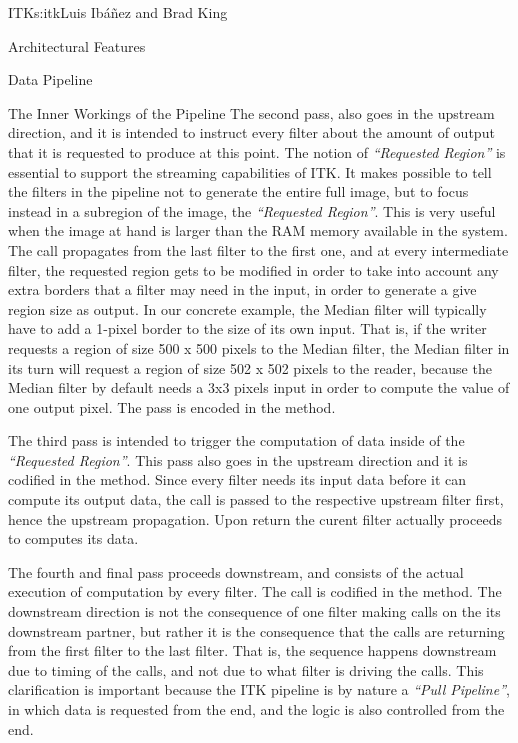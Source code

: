\begin{aosachapter}{ITK}{s:itk}{Luis Ib\'{a}\~{n}ez and Brad King}
\begin{aosasect1}{Architectural Features}
\begin{aosasect2}{Data Pipeline}
\begin{aosasect3}{The Inner Workings of the Pipeline}
The second pass, also goes in the upstream direction, and it is intended to
instruct every filter about the amount of output that it is requested to
produce at this point. The notion of \emph{``Requested Region''} is essential
to support the streaming capabilities of ITK. It makes possible to tell the
filters in the pipeline not to generate the entire full image, but to focus
instead in a subregion of the image, the \emph{``Requested Region''}. This is
very useful when the image at hand is larger than the RAM memory available in
the system. The call propagates from the last filter to the first one, and at
every intermediate filter, the requested region gets to be modified in order to
take into account any extra borders that a filter may need in the input, in
order to generate a give region size as output. In our concrete example, the
Median filter will typically have to add a 1-pixel border to the size of its
own input. That is, if the writer requests a region of size 500 x 500 pixels to
the Median filter, the Median filter in its turn will request a region of size
502 x 502 pixels to the reader, because the Median filter by default needs a
3x3 pixels input in order to compute the value of one output pixel. The pass is
encoded in the  method.

The third pass is intended to trigger the computation of data inside of the
\emph{``Requested Region''}. This pass also goes in the upstream direction and
it is codified in the  method.  Since every filter
needs its input data before it can compute its output data, the call is passed
to the respective upstream filter first, hence the upstream propagation. Upon
return the curent filter actually proceeds to computes its data.

The fourth and final pass proceeds downstream, and consists of the actual
execution of computation by every filter. The call is codified in the
 method. The downstream direction is not the consequence
of one filter making calls on the its downstream partner, but rather it is the
consequence that the  calls are returning from the
first filter to the last filter. That is, the sequence happens downstream due
to timing of the calls, and not due to what filter is driving the calls. This
clarification is important because the ITK pipeline is by nature a \emph{``Pull
Pipeline''}, in which data is requested from the end, and the logic is also
controlled from the end.

\end{aosasect3}


\end{aosasect2}
\end{aosasect1}
\end{aosachapter}

